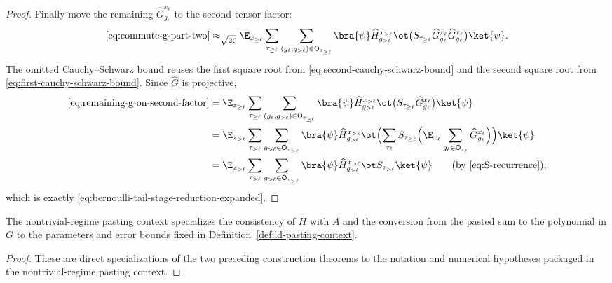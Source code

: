 \begin{proof}
	Finally move the remaining $\widehat G_{g_\ell}^{x_\ell}$ to the second tensor factor:
	\begin{align}
		\eqref{eq:commute-g-part-two}
		\approx_{\sqrt{2\zeta}}
		\E_{x_{\ge \ell}} \sum_{\tau_{\ge \ell}} \sum_{(g_\ell,g_{>\ell})\in \mathsf O_{\tau_{\ge \ell}}}
		\bra{\psi}
		\widehat H_{g_{>\ell}}^{x_{>\ell}}
		\ot \bigl(S_{\tau_{\ge \ell}}\widehat G_{g_\ell}^{x_\ell}\widehat G_{g_\ell}^{x_\ell}\bigr)
		\ket{\psi}.
		\label{eq:remaining-g-on-second-factor}
	\end{align}
	The omitted Cauchy--Schwarz bound reuses the first square root from \ref{eq:second-cauchy-schwarz-bound} and the second square root from \ref{eq:first-cauchy-schwarz-bound}. Since $\widehat G$ is projective,
	\begin{align*}
		\eqref{eq:remaining-g-on-second-factor}
		 & =
		\E_{x_{\ge \ell}} \sum_{\tau_{\ge \ell}} \sum_{(g_\ell,g_{>\ell})\in \mathsf O_{\tau_{\ge \ell}}}
		\bra{\psi}
		\widehat H_{g_{>\ell}}^{x_{>\ell}}
		\ot \bigl(S_{\tau_{\ge \ell}}\widehat G_{g_\ell}^{x_\ell}\bigr)
		\ket{\psi} \\
		 & =
		\E_{x_{>\ell}} \sum_{\tau_{>\ell}} \sum_{g_{>\ell}\in \mathsf O_{\tau_{>\ell}}}
		\bra{\psi}
		\widehat H_{g_{>\ell}}^{x_{>\ell}}
		\ot
		\Bigl(\sum_{\tau_\ell}
		S_{\tau_{\ge \ell}}
		\Bigl(\E_{x_\ell}\sum_{g_\ell\in \mathsf O_{\tau_\ell}} \widehat G_{g_\ell}^{x_\ell}\Bigr)\Bigr)
		\ket{\psi} \\
		 & =
		\E_{x_{>\ell}} \sum_{\tau_{>\ell}} \sum_{g_{>\ell}\in \mathsf O_{\tau_{>\ell}}}
		\bra{\psi}
		\widehat H_{g_{>\ell}}^{x_{>\ell}} \ot S_{\tau_{>\ell}}
		\ket{\psi}
		\tag{by \ref{eq:S-recurrence}},
	\end{align*}
	which is exactly \ref{eq:bernoulli-tail-stage-reduction-expanded}.
\end{proof}

\begin{lemma}\label{lem:pasting-context-specializations}
	\leanok
	The nontrivial-regime pasting context specializes the consistency of $H$ with $A$ and
	the conversion from the pasted sum to the polynomial in $G$ to the parameters
	and error bounds fixed in Definition~\ref{def:ld-pasting-context}.
\end{lemma}
\begin{proof}
	\leanok
	These are direct specializations of the two preceding construction theorems
	to the notation and numerical hypotheses packaged in the nontrivial-regime
	pasting context.
\end{proof}

